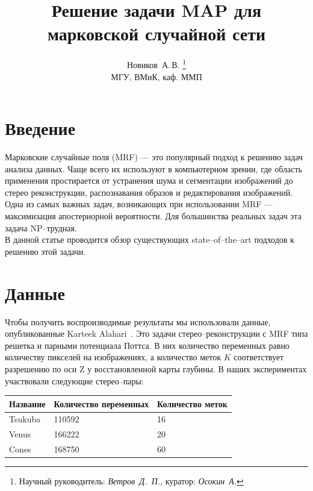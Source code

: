\documentclass{article}
\title
    {Решение задачи MAP для марковской случайной сети}
\author
    {Новиков~А.\,В.
    \thanks{Научный руководитель: \textit{Ветров~Д.~П.}, куратор: \textit{Осокин~А.}}
    \\МГУ, ВМиК, каф. ММП
    }
\begin{document}
\maketitle

\pagebreak
\setcounter{tocdepth}{1}
 \tableofcontents
\pagebreak

\section{Введение}
Марковские случайные поля (MRF) --- это популярный подход к решению задач анализа данных. Чаще всего их используют в компьютерном зрении, где область применения простирается от устранения шума и сегментации изображений до стерео реконструкции, распознавания образов и редактирования изображений.
Одна из самых важных задач, возникающих при использовании MRF --- максимизация апостериорной вероятности. Для большинства реальных задач эта задача NP--трудная.\\
В данной статье проводится обзор существующих
state--of--the--art подходов к решению этой задачи.




\section{Данные}
Чтобы получить воспроизводимые результаты мы использовали данные, опубликованные Karteek Alahari~\cite{Alahari}. Это задачи стерео--реконструкции с MRF типа решетка и парными потенциала Поттса. В них количество переменных равно количеству пикселей на изображениях, а количество меток $K$ соответствует разрешению по оси Z у восстановленной карты глубины. В наших экспериментах участвовали следующие стерео--пары:
\begin{center}
    \begin{tabular}{ | l | l | l |}
    \hline
    Название & Количество переменных & Количество меток\\ \hline
    Tsukuba  & 110592 & 16\\ \hline
    Venus  & 166222 & 20\\ \hline
    Cones  & 168750 & 60\\ \hline
    \end{tabular}
\end{center}
\end{document}
